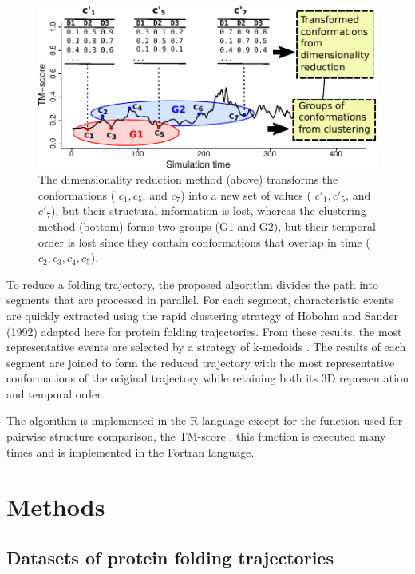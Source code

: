 \documentclass[twocolumn]{bmcart}%
\begin{document}
\begin{figure}[th]
\includegraphics[viewport=0bp 0bp 210bp 104bp,scale=1.05]{images/02-2RN2-trajectory-weakness}

\caption{ The dimensionality reduction method (above) transforms the conformations ( $c_{1},c_{5}$, and $c_{7}$) into a new set of values ( $c'_{1},c'_{5}$, and $c'_{7}$), but their structural information is lost, whereas the clustering method (bottom) forms two groups (G1 and G2), but their temporal order is lost since they contain conformations that overlap in time ($c_{2},c_{3},c_{4},c_{5}$). \label{fig:lost-info-dimensionality}}
\end{figure}

To reduce a folding trajectory, the proposed algorithm divides the path into segments that are processed in parallel. For each segment, characteristic events are quickly extracted using the rapid clustering strategy of Hobohm and Sander (1992) adapted here for protein folding trajectories. From these results, the most representative events are selected by a strategy of k-medoids \cite{Kaufman1990}. The results of each segment are joined to form the reduced trajectory with the most representative conformations of the original trajectory while retaining both its 3D representation and temporal order.

The algorithm is implemented in the R language except for the function used for pairwise structure comparison, the TM-score \cite{Zhang2004}, this function is executed many times and is implemented in the Fortran language.

\section*{Methods}

\subsection*{Datasets of protein folding trajectories}
\end{document}
